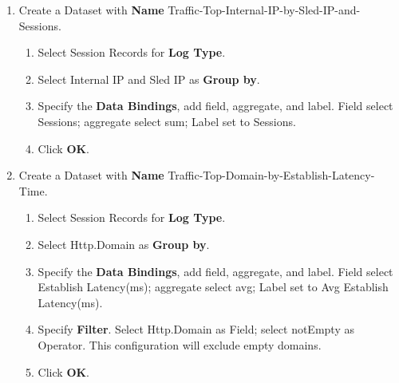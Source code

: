 \begin{description}
\begin{enumerate}
\begin{enumerate}
\begin{enumerate}
                \item	Field select Bytes Sent and Bytes Received; aggregate select sum; Label set to Bytes. 
                \item	Field select Client IP; aggregate select count distinct; Label set to Unique Client IP. 
            \end{enumerate}
            \item	Specify \textbf{Filter}. Select SSL.Intercept State as Field; select “=” as Operator; set Value to Intercept. This configuration will only include Security Events with intercept action.
            \item	Specify \textbf{Having}. Field select Bytes Sent and Bytes Received; Aggregate select sum; Operator select “>=”; Value set to 65535. 
            \item	Click \textbf{OK}.
        \end{enumerate}
        \item 	Create a Dataset with \textbf{Name} Traffic-Top-Internal-IP-by-Sled-IP-and-Sessions.
        \begin{enumerate}
            \item	Select Session Records for \textbf{Log Type}.
            \item	Select Internal IP and Sled IP as \textbf{Group by}. 
            \item	Specify the \textbf{Data Bindings}, add field, aggregate, and label. Field select Sessions; aggregate select sum; Label set to Sessions. 
            \item	Click \textbf{OK}.
        \end{enumerate}
        \item 	Create a Dataset with \textbf{Name} Traffic-Top-Domain-by-Establish-Latency-Time.
        \begin{enumerate}
            \item	Select Session Records for \textbf{Log Type}.
            \item	Select Http.Domain as \textbf{Group by}. 
            \item	Specify the \textbf{Data Bindings}, add field, aggregate, and label. Field select Establish Latency(ms); aggregate select avg; Label set to Avg Establish Latency(ms). 
            \item	Specify \textbf{Filter}. Select Http.Domain as Field; select notEmpty as Operator. This configuration will exclude empty domains.
            \item	Click \textbf{OK}.

\end{enumerate}
\end{enumerate}
\end{description}
